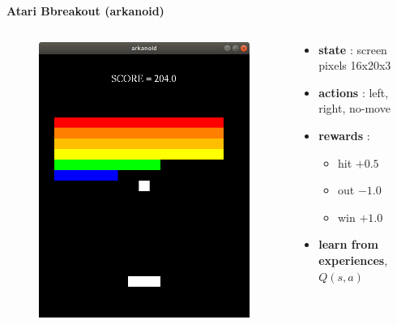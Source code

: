 \documentclass[xcolor=dvipsnames]{beamer}
\begin{document}
\begin{frame}{\bf Atari Bbreakout (arkanoid)}

\begin{columns}
    \begin{column}{0.5\textwidth}

        \begin{figure}
          \includegraphics[scale=0.3]{../../pictures/arkanoid.png}
        \end{figure}

    \end{column}
    \begin{column}{0.5\textwidth}

        \begin{itemize}
          \item {\bf state} : screen pixels 16x20x3
          \item {\bf actions} : left, right, no-move
          \item {\bf rewards} :
                \begin{itemize}
                    \item hit $+0.5$
                    \item out $-1.0$
                    \item win $+1.0$
                \end{itemize}
          \item {\bf learn from experiences}, $Q(s, a)$
        \end{itemize}


\end{column}
\end{columns}
\end{frame}
\end{document}
